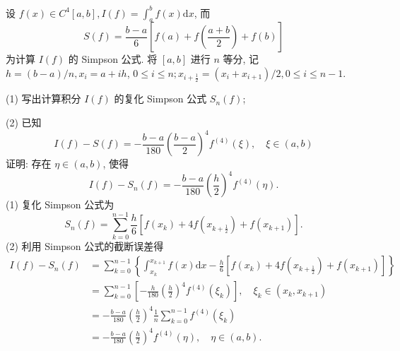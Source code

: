  




 \begin{tcolorbox}[enhanced,colback=10,colframe=9,breakable,coltitle=green!25!black,title=2024]
 设 $ f(x) \in C^{4}[a, b], I(f)=\int_{a}^{b} f(x) \mathrm{d} x $, 而
$$
S(f)=\frac{b-a}{6}\left[f(a)+f\left(\frac{a+b}{2}\right)+f(b)\right]
$$
为计算 $ I(f) $ 的 Simpson 公式. 将 $ [a, b] $ 进行 $ n $ 等分, 记 $ h=(b-a) / n, x_{i}=a+i h $, $ 0 \leqslant i \leqslant n ; x_{i+\frac{1}{2}}=\left(x_{i}+x_{i+1}\right) / 2,0 \leqslant i \leqslant n-1 $.

(1) 写出计算积分 $ I(f) $ 的复化 Simpson 公式 $ S_{n}(f) $;

(2) 已知
$$
I(f)-S(f)=-\frac{b-a}{180}\left(\frac{b-a}{2}\right)^{4} f^{(4)}(\xi), \quad \xi \in(a, b)
$$
证明: 存在 $ \eta \in(a, b) $, 使得
$$
I(f)-S_{n}(f)=-\frac{b-a}{180}\left(\frac{h}{2}\right)^{4} f^{(4)}(\eta) .
$$
\tcblower
 (1) 复化 Simpson 公式为
$$
S_{n}(f)=\sum_{k=0}^{n-1} \frac{h}{6}\left[f\left(x_{k}\right)+4 f\left(x_{k+\frac{1}{2}}\right)+f\left(x_{k+1}\right)\right] .
$$
(2) 利用 Simpson 公式的截断误差得
$$
\begin{aligned}
I(f)-S_{n}(f) & =\sum_{k=0}^{n-1}\left\{\int_{x_{k}}^{x_{k+1}} f(x) \mathrm{d} x-\frac{h}{6}\left[f\left(x_{k}\right)+4 f\left(x_{k+\frac{1}{2}}\right)+f\left(x_{k+1}\right)\right]\right\} \\
& =\sum_{k=0}^{n-1}\left[-\frac{h}{180}\left(\frac{h}{2}\right)^{4} f^{(4)}\left(\xi_{k}\right)\right], \quad \xi_{k} \in\left(x_{k}, x_{k+1}\right) \\
& =-\frac{b-a}{180}\left(\frac{h}{2}\right)^{4} \frac{1}{n} \sum_{k=0}^{n-1} f^{(4)}\left(\xi_{k}\right) \\
& =-\frac{b-a}{180}\left(\frac{h}{2}\right)^{4} f^{(4)}(\eta), \quad \eta \in(a, b) .
\end{aligned}
$$
\end{tcolorbox}

